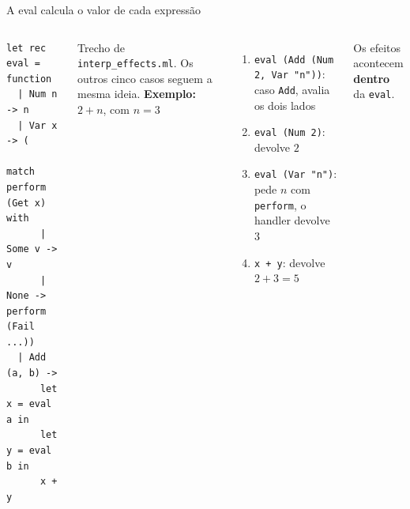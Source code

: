\documentclass[aspectratio=169,10pt]{beamer}
\newcommand{\oc}[1]{\textcolor{ocamlc}{#1}}
\begin{document}
\begin{frame}[fragile]{A eval calcula o valor de cada expressão}
  \begin{columns}[T]
\begin{lstlisting}[language=OCamlTCC]
let rec eval = function
  | Num n -> n
  | Var x -> (
      match perform (Get x) with
      | Some v -> v
      | None -> perform (Fail ...))
  | Add (a, b) ->
      let x = eval a in
      let y = eval b in
      x + y
\end{lstlisting}
    {\small Trecho de \texttt{interp\_effects.ml}. Os outros cinco casos seguem a mesma ideia.}
    \textbf{Exemplo:} $2 + n$, com $n = 3$
    \begin{enumerate}
      \item \texttt{eval (Add (Num 2, Var "n"))}: caso \texttt{Add}, avalia os dois lados
      \item \texttt{eval (Num 2)}: devolve $2$
      \item \texttt{eval (Var "n")}: \oc{pede $n$ com \texttt{perform}, o handler devolve $3$}
      \item \texttt{x + y}: devolve $2 + 3 = 5$
    \end{enumerate}
    \vspace{4pt}
    Os efeitos acontecem \textbf{dentro} da \texttt{eval}.
  \end{columns}
\end{frame}
\end{document}
